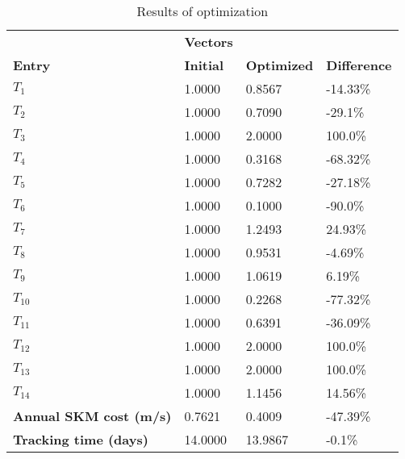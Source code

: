 \begin{table}[H]
\centering
\begin{tabular}{llll}
\textbf{}      & \cellcolor[HTML]{EFEFEF}\textbf{Vectors} & \textbf{} & \textbf{}         \\
\rowcolor[HTML]{EFEFEF} 
\textbf{Entry} & \textbf{Initial} & \textbf{Optimized} & \textbf{Difference} \\
$T_1$ & 1.0000 & 0.8567 & -14.33\% \\ 
$T_2$ & 1.0000 & 0.7090 & -29.1\% \\ 
$T_3$ & 1.0000 & 2.0000 & 100.0\% \\ 
$T_4$ & 1.0000 & 0.3168 & -68.32\% \\ 
$T_5$ & 1.0000 & 0.7282 & -27.18\% \\ 
$T_6$ & 1.0000 & 0.1000 & -90.0\% \\ 
$T_7$ & 1.0000 & 1.2493 & 24.93\% \\ 
$T_8$ & 1.0000 & 0.9531 & -4.69\% \\ 
$T_9$ & 1.0000 & 1.0619 & 6.19\% \\ 
$T_10$ & 1.0000 & 0.2268 & -77.32\% \\ 
$T_11$ & 1.0000 & 0.6391 & -36.09\% \\ 
$T_12$ & 1.0000 & 2.0000 & 100.0\% \\ 
$T_13$ & 1.0000 & 2.0000 & 100.0\% \\ 
$T_14$ & 1.0000 & 1.1456 & 14.56\% \\ 
\rowcolor[HTML]{EFEFEF} 
\textbf{Annual SKM cost (m/s)}  & 0.7621 & 0.4009 & -47.39\% \\ 
\rowcolor[HTML]{EFEFEF} 
\textbf{Tracking time (days)}  & 14.0000 & 13.9867 & -0.1\% \\ 
\end{tabular}
\caption{Results of optimization}
\label{tab:OptimizationAnalysis}
\end{table}